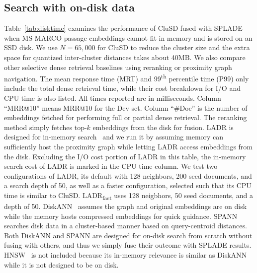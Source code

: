 \subsection{ Search with on-disk data}
\label{sect:evaldisk}

Table~\ref{tab:disktime} examines the performance  of CluSD fused with SPLADE when MS MARCO passage 
embeddings  cannot fit in memory and is stored on an SSD disk.
We use  $N=65,000$ for CluSD to reduce the cluster size and the extra space for quantized inter-cluster distances takes about 40MB. 
We also compare other selective dense retrieval baselines using  reranking or proximity graph navigation.
The mean response time (MRT) and 99\textsuperscript{th} percentile time (P99) only
include the total dense retrieval time, while their cost breakdown for I/O and CPU time is also listed. 
All times reported are in milliseconds. 
Column ``MRR@10'' means  MRR@10 for the Dev set. 
Column ``\#Doc'' is the number of embeddings fetched for performing full or partial dense retrieval.
The reranking method simply fetches top-$k$ embeddings  from the disk for fusion. 
LADR is designed for in-memory search~\cite{2023SIGIR-LADR} and we run it by  assuming  memory can sufficiently host the proximity  graph while letting LADR access  embeddings from the disk. 
Excluding the I/O cost portion of LADR in this table, the in-memory search cost of LADR is marked in the CPU time column.
We test two configurations of LADR, its default with 128 neighbors, 200 seed documents, and a search depth of 50,
as well as a faster configuration, selected such that its CPU time is similar to CluSD. 
LADR\textsubscript{fast} uses 128 neigbhors, 50 seed documents, and a depth of 50.
DiskANN~\cite{NEURIPS2019_DiskANN} assumes the graph and original embeddings are on disk  while the memory  hosts
compressed embeddings for quick guidance.  SPANN~\cite{chen2021spann} searches disk data in a cluster-based manner based on query-centroid distances.
Both DiskANN and SPANN  are designed for on-disk search from scratch without fusing with others, and thus we simply fuse their outcome with SPLADE results.
HNSW~\cite{2020TPAMI-HNSW} is not included because its in-memory relevance  is similar as DiskANN while it is not designed to be on disk. 

